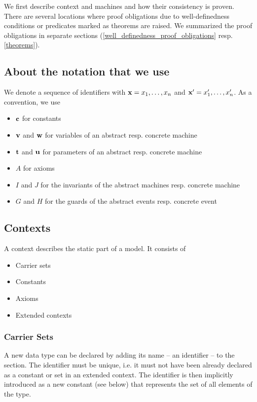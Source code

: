 We first describe context and machines and how their consistency is proven.
There are several locations where proof obligations due to well-definedness conditions
 or predicates marked as theorems are raised.
We summarized the proof obligations in separate sections (\ref{well_definedness_proof_obligations}
resp. \ref{theorems}).


\subsection{About the notation that we use}
\label{about_the_notation}

We denote a sequence of identifiers with $\mathbf{x} = x_1,\ldots,x_n$ and $\mathbf{x}' = x'_1,\ldots,x'_n$.
As a convention, we use
\begin{itemize}
\item $\mathbf{c}$ for constants
\item $\mathbf{v}$ and $\mathbf{w}$ for variables of an abstract resp. concrete machine
\item $\mathbf{t}$ and $\mathbf{u}$ for parameters of an abstract resp. concrete machine
\item $A$ for axioms
\item $I$ and $J$ for the invariants of the abstract machines resp. concrete machine
\item $G$ and $H$ for the guards of the abstract events resp. concrete event
\end{itemize}

\subsection{Contexts}
\label{context}

A context describes the static part of a model. It consists of
\begin{itemize}
\item Carrier sets
\item Constants
\item Axioms
\item Extended contexts
\end{itemize}

\subsubsection{Carrier Sets}
\label{carrier_sets}
A new data type can be declared by adding its name -- an identifier -- to the  section.
The identifier must be unique, i.e. it must not have been already declared as a constant or set in an extended context.
The identifier is then implicitly introduced as a new constant (see below) that represents the set of all elements of the type. 

